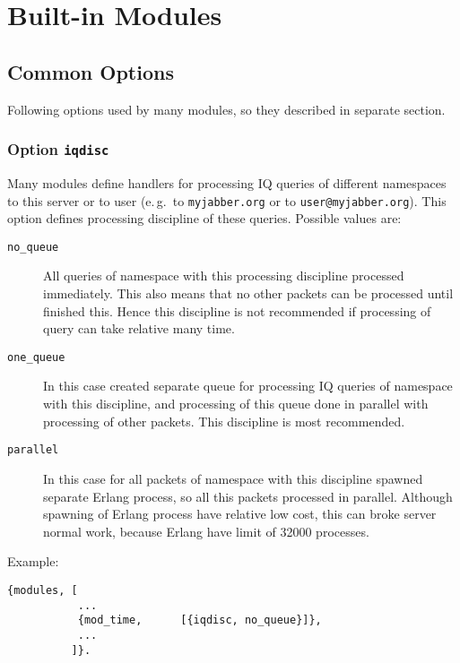 \documentclass[10pt]{article}
\begin{document}
\appendix{}

\section{Built-in Modules}
\label{sec:modules}



\subsection{Common Options}
\label{sec:modcommonopts}

Following options used by many modules, so they described in separate section.


\subsubsection{Option \texttt{iqdisc}}

Many modules define handlers for processing IQ queries of different namespaces
to this server or to user (e.\,g.\ to \texttt{myjabber.org} or to
\texttt{user@myjabber.org}).  This option defines processing discipline of
these queries.  Possible values are:
\begin{description}
\item[\texttt{no\_queue}] All queries of namespace with this processing
  discipline processed immediately.  This also means that no other packets can
  be processed until finished this.  Hence this discipline is not recommended
  if processing of query can take relative many time.
\item[\texttt{one\_queue}] In this case created separate queue for processing
  IQ queries of namespace with this discipline, and processing of this queue
  done in parallel with processing of other packets. This discipline is most
  recommended.
\item[\texttt{parallel}] In this case for all packets of namespace with this
  discipline spawned separate Erlang process, so all this packets processed in
  parallel.  Although spawning of Erlang process have relative low cost, this
  can broke server normal work, because Erlang have limit of 32000 processes.
\end{description}

Example:
\begin{verbatim}
{modules, [
           ...
           {mod_time,      [{iqdisc, no_queue}]},
           ...
          ]}.
\end{verbatim}
\end{document}

